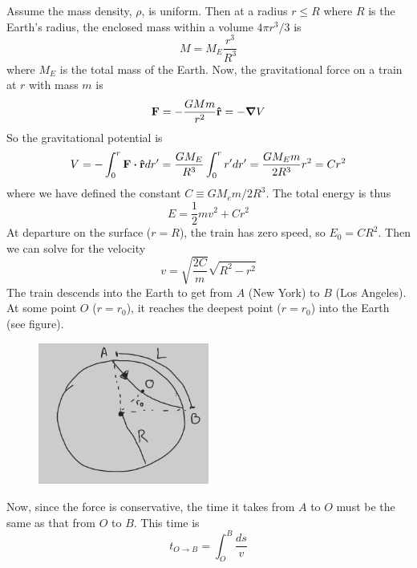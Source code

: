 \documentclass[12pt]{article}
\begin{document}
\begin{problem}{2}
\begin{solution}
    Assume the mass density, $\rho$, is uniform. Then at a radius $r\leq R$
    where $R$ is the Earth's radius, the enclosed mass within a volume $4\pi
    r^3/3$ is
    \begin{equation}
        M=M_E\frac{r^3}{R^3} 
    \end{equation}
    where $M_E$ is the total mass of the Earth. Now, the gravitational force on
    a train at $r$ with mass $m$ is
    \begin{equation}
        \vb{F}=-\frac{GMm}{r^2}\vb{\hat{r}}=-\grad{V}
    \end{equation}
    So the gravitational potential is
    \begin{equation}
        V=-\int_0^r\vb{F}\vdot\rhat dr'
        =\frac{GM_E}{R^3}\int_0^rr'dr'
        =\frac{GM_Em}{2R^3}r^2=Cr^2
    \end{equation}
    where we have defined the constant $C\equiv GM_em/2R^3$. The total energy 
    is thus
    \begin{equation}
        E=\frac12mv^2+Cr^2    
    \end{equation}
    At departure on the surface ($r=R$), the train has zero speed, so
    $E_0=CR^2$. Then we can solve for the velocity
    \begin{equation}
        v=\sqrt{\frac{2C}{m}}\sqrt{R^2-r^2} 
    \end{equation}
    The train descends into the Earth to get from $A$ (New York) to $B$
    (Los Angeles). At some point $O$ ($r=r_0$), it reaches the deepest point   
    ($r=r_0$) into the Earth (see figure).
    \begin{figure}[h]
        \centering
        \includegraphics[width=0.5\textwidth]{hw1_p2.jpg}
    \end{figure}
    Now, since the force is conservative, the time it 
    takes from $A$ to $O$ must be the same as that from $O$ to $B$. This time is
    \begin{equation}
        t_{O\to B}=\int_O^B\frac{ds}{v}

\end{equation}
\end{solution}
\end{problem}
\end{document}
